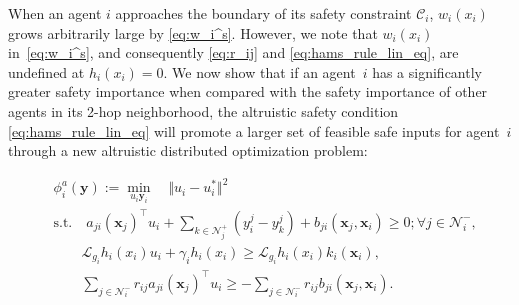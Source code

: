 \documentclass[letterpaper, 10 pt, conference]{ieeeconf}  %
\theoremstyle{plain}
\begin{document}
When an agent $i$ approaches the boundary of its safety constraint $\mathcal{C}_i$, $w_i(x_i)$ grows arbitrarily large by \eqref{eq:w_i^s}. However, we note that $w_i(x_i)$ in~\eqref{eq:w_i^s}, and consequently \eqref{eq:r_ij} and \eqref{eq:hams_rule_lin_eq}, are undefined at $h_i(x_i) = 0$.
We now show that if an agent~$i$ has a significantly greater safety importance when compared with the safety importance of other agents in its 2-hop neighborhood, the altruistic safety condition \eqref{eq:hams_rule_lin_eq} will promote a larger set of feasible safe inputs for agent~$i$ through a new altruistic distributed optimization problem:

\vspace{-2ex}
\small
\begin{align}
    &\phi_i^a(\mathbf{y}) := \min_{u_i \mathbf{y}_i} \quad \Vert u_i - u_{i}^* \Vert^2 \nonumber \\
    & \text{s.t.}  \quad a_{ji}(\mathbf{x}_j)^\top u_i  + \sum_{k \in \mathcal{N}_j^+} (y_i^j - y_k^j) +  b_{ji}(\mathbf{x}_j,\mathbf{x}_i) \geq 0
     ;\forall j \in \mathcal{N}_i^-, \nonumber\\
     & \quad  \quad
     \mathcal{L}_{g_i}h_i(x_i) u_i +  \gamma_i h_i(x_i) \geq \mathcal{L}_{g_i}h_i(x_i) k_i(\mathbf{x}_i), \nonumber \\
     & \quad  \quad
    \sum_{j \in \mathcal{N}_i^-} r_{ij}  a_{ji}(\mathbf{x}_j)^\top u_i 
    \geq  - \sum_{j \in \mathcal{N}_i^-} r_{ij} b_{ji}(\mathbf{x}_j,\mathbf{x}_i). \label{eq:prob_statement_distr_alt}
\end{align}
\normalsize
\end{document}
